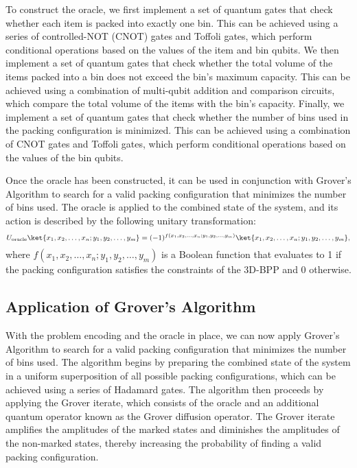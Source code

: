 To construct the oracle, we first implement a set of quantum gates that check whether each item is packed into exactly one bin. This can be achieved using a series of controlled-NOT (CNOT) gates and Toffoli gates, which perform conditional operations based on the values of the item and bin qubits. We then implement a set of quantum gates that check whether the total volume of the items packed into a bin does not exceed the bin's maximum capacity. This can be achieved using a combination of multi-qubit addition and comparison circuits, which compare the total volume of the items with the bin's capacity. Finally, we implement a set of quantum gates that check whether the number of bins used in the packing configuration is minimized. This can be achieved using a combination of CNOT gates and Toffoli gates, which perform conditional operations based on the values of the bin qubits.

Once the oracle has been constructed, it can be used in conjunction with Grover's Algorithm to search for a valid packing configuration that minimizes the number of bins used. The oracle is applied to the combined state of the system, and its action is described by the following unitary transformation:
\begin{equation}
    U_\text{oracle} \ket{x_1, x_2, \ldots, x_n; y_1, y_2, \ldots, y_m} = (-1)^{f(x_1, x_2, \ldots, x_n; y_1, y_2, \ldots, y_m)} \ket{x_1, x_2, \ldots, x_n; y_1, y_2, \ldots, y_m},
\end{equation}
where $f(x_1, x_2, \ldots, x_n; y_1, y_2, \ldots, y_m)$ is a Boolean function that evaluates to 1 if the packing configuration satisfies the constraints of the 3D-BPP and 0 otherwise.

\subsection{Application of Grover's Algorithm}
With the problem encoding and the oracle in place, we can now apply Grover's Algorithm to search for a valid packing configuration that minimizes the number of bins used. The algorithm begins by preparing the combined state of the system in a uniform superposition of all possible packing configurations, which can be achieved using a series of Hadamard gates. The algorithm then proceeds by applying the Grover iterate, which consists of the oracle and an additional quantum operator known as the Grover diffusion operator. The Grover iterate amplifies the amplitudes of the marked states and diminishes the amplitudes of the non-marked states, thereby increasing the probability of finding a valid packing configuration.

